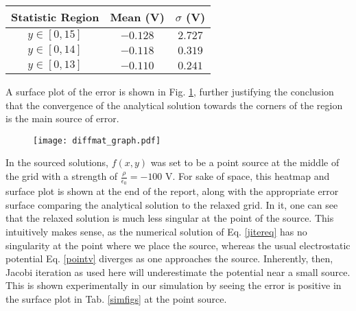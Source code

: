 \documentclass[reprint, amsmath, amssymb, aps, floatfix]{revtex4-1}
\begin{document}
\begin{table}
	\vspace{2ex}
\begin{tabular}{|c|c|c|}
	\hline
	Statistic Region & Mean (V) & $\sigma$ (V)  \\ \hline
	$y\in[0,15]$ & $-0.128$ & $2.727$ \\ \hline
	$y\in[0, 14]$ & $-0.118$ & $0.319$ \\ \hline
	$y\in[0, 13]$ & $-0.110$ & $0.241$  \\ \hline
\end{tabular}
\vspace{1ex}
\label{tab:stats}
\end{table}

A surface plot of the error is shown in Fig. \ref{diffmat}, further justifying the conclusion that the convergence of the analytical solution towards the corners of the region is the main source of error.

\begin{figure}
	\texttt{[image: diffmat\_graph.pdf]}
	\label{diffmat}
\end{figure}


In the sourced solutions, $f(x,y)$ was set to be a point source at the middle of the grid with a strength of $ \frac{\rho}{\epsilon_0}=-100$ V. For sake of space, this heatmap and surface plot is shown at the end of the report, along with the appropriate error surface comparing the analytical solution to the relaxed grid. In it, one can see that the relaxed solution is much less singular at the point of the source. This intuitively makes sense, as the numerical solution of Eq. \eqref{jitereq} has no singularity at the point where we place the source, whereas the usual electrostatic potential Eq. \eqref{pointv} diverges as one approaches the source. Inherently, then, Jacobi iteration as used here will underestimate the potential near a small source. This is shown experimentally in our simulation by seeing the error is positive in the surface plot in Tab. \ref{simfigs} at the point source.
\end{document}
